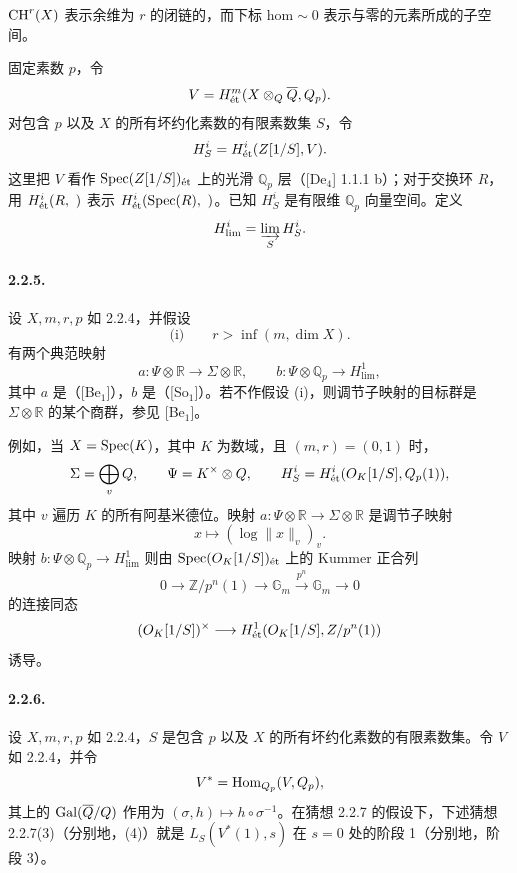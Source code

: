 $\operatorname{CH}^r(X)$ 表示余维为 $r$ 的闭链的，而下标 $\mathrm{hom}\sim0$ 表示与零的元素所成的子空间。

固定素数 $p$，令
\[
 V=H^m_{\mathrm{\acute et}}(X\otimes_{Q}\overline{Q},Q_p).
\]
对包含 $p$ 以及 $X$ 的所有坏约化素数的有限素数集 $S$，令
\[
 H^i_S=H^i_{\mathrm{\acute et}}(Z[1/S],V).
\]
这里把 $V$ 看作 $\operatorname{Spec}(Z[1/S])_{\mathrm{\acute et}}$ 上的光滑 $\mathbb Q_p$ 层（[De$_4$] 1.1.1 b）；对于交换环 $R$，用 $H^i_{\mathrm{\acute et}}(R,\ )$ 表示 $H^i_{\mathrm{\acute et}}(\operatorname{Spec}(R),\ )$。已知 $H^i_S$ 是有限维 $\mathbb Q_p$ 向量空间。定义
\[
 H^i_{\mathrm{lim}}=\varinjlim_S H^i_S.
\]

\paragraph{2.2.5.} 设 $X,m,r,p$ 如 2.2.4，并假设
\[
 \text{(i)}\qquad r>\inf(m,\dim X).
\]
有两个典范映射
\[
 a:\Psi\otimes\mathbb R\longrightarrow\Sigma\otimes\mathbb R,
 \qquad b:\Psi\otimes\mathbb Q_p\longrightarrow H^1_{\mathrm{lim}},
\]
其中 $a$ 是（[Be$_1$]），$b$ 是（[So$_1$]）。若不作假设 (i)，则调节子映射的目标群是 $\Sigma\otimes\mathbb R$ 的某个商群，参见 [Be$_1$]。

例如，当 $X=\operatorname{Spec}(K)$，其中 $K$ 为数域，且 $(m,r)=(0,1)$ 时，
\[
 \Sigma=\bigoplus_vQ,
 \qquad \Psi=K^\times\otimes Q,
 \qquad H^i_S=H^i_{\mathrm{\acute et}}(O_K[1/S],Q_p(1)),
\]
其中 $v$ 遍历 $K$ 的所有阿基米德位。映射 $a:\Psi\otimes\mathbb R\to\Sigma\otimes\mathbb R$ 是调节子映射
\[
 x\longmapsto(\log\lVert x\rVert_v)_v.
\]
映射 $b:\Psi\otimes\mathbb Q_p\to H^1_{\mathrm{lim}}$ 则由 $\operatorname{Spec}(O_K[1/S])_{\mathrm{\acute et}}$ 上的 Kummer 正合列
\[
 0\longrightarrow\mathbb Z/p^n(1)\longrightarrow\mathbb G_m
 \xrightarrow{p^n}\mathbb G_m\longrightarrow0
\]
的连接同态
\[
 (O_K[1/S])^\times\longrightarrow
 H^1_{\mathrm{\acute et}}(O_K[1/S],Z/p^n(1))
\]
诱导。

\paragraph{2.2.6.} 设 $X,m,r,p$ 如 2.2.4，$S$ 是包含 $p$ 以及 $X$ 的所有坏约化素数的有限素数集。令 $V$ 如 2.2.4，并令
\[
 V^*=\operatorname{Hom}_{Q_p}(V,Q_p),
\]
其上的 $\operatorname{Gal}(\overline{Q}/Q)$ 作用为 $(\sigma,h)\mapsto h\circ\sigma^{-1}$。在猜想 2.2.7 的假设下，下述猜想 2.2.7(3)（分别地，(4)）就是 $L_S(V^*(1),s)$ 在 $s=0$ 处的阶段 1（分别地，阶段 3）。

